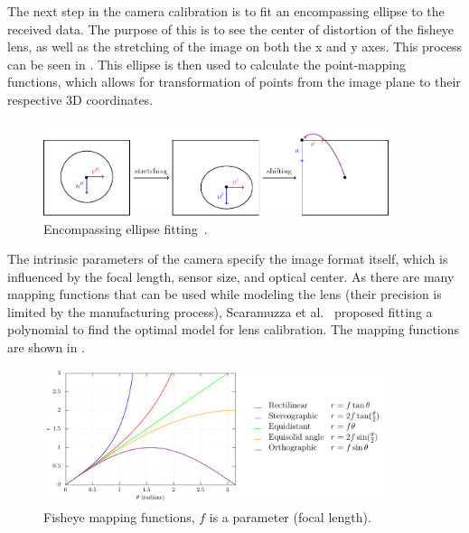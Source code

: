 The next step in the camera calibration is to fit an encompassing ellipse to the received data. The purpose of this is to see the center of distortion of the fisheye lens, as well
as the stretching of the image on both the x and y axes. This process can be seen in . This ellipse is then used to calculate the point-mapping functions, which allows for transformation of points from
the image plane to their respective 3D coordinates.
\begin{figure}[H]
	\centering
	\includegraphics[width=0.9\textwidth]{./fig/tikz/ellipse.pdf}
	\caption{Encompassing ellipse fitting~\cite{scaramuzzacalibration}.}
	\label{fig:ellipse}
  \end{figure}
The intrinsic parameters of the camera specify the image format itself, which is influenced by the focal length, sensor size, and optical center. As there are many mapping
functions that can be used while modeling the lens (their precision is limited by the manufacturing process), Scaramuzza et al.~\cite{scaramuzzacalibration} proposed
fitting a polynomial to find the optimal model for lens calibration. The mapping functions are shown in .
\begin{figure}[H]
  \centering
  \includegraphics[width=0.9\textwidth]{./fig/tikz/mapping.pdf}
  \caption{Fisheye mapping functions, $f$ is a parameter (focal length).}
  \label{fig:mapping_functions}
\end{figure}


